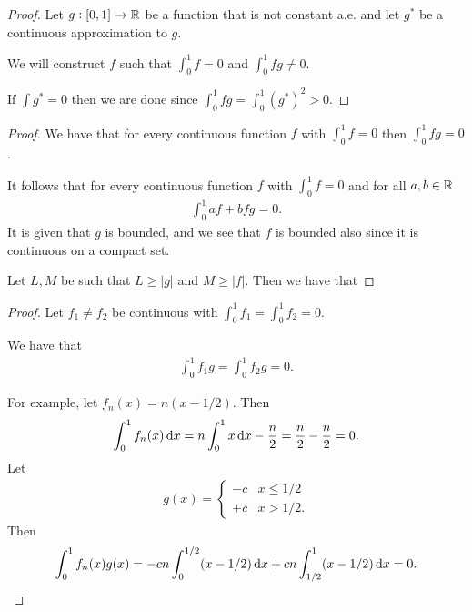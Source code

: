 \begin{proof}
  Let $g: [0, 1] \to \mathbb{R}$ be a function that is not constant a.e. and let $g^*$ be a continuous approximation
  to $g$.

  We will construct $f$ such that $\int_0^1 f = 0$ and $\int_0^1 fg \neq 0$.

  If $\int g^* = 0$ then we are done since $\int_0^1 fg = \int_0^1 (g^*)^2 > 0$.


\end{proof}




\begin{proof}
  We have that for every continuous function $f$ with $\int_0^1 f = 0$ then $\int_0^1 fg = 0$.

  It follows that for every continuous function $f$ with $\int_0^1 f = 0$ and for all $a, b \in \mathbb{R}$
  \begin{align*}
    \int_0^1 af + bfg = 0.
  \end{align*}
  It is given that $g$ is bounded, and we see that $f$ is bounded also since it is continuous on a compact set.

  Let $L, M$ be such that $L \geq |g|$ and $M \geq |f|$. Then we have that


\end{proof}


\begin{proof}
  Let $f_1 \neq f_2$ be continuous with $\int_0^1 f_1 = \int_0^1 f_2 = 0$.

  We have that
  \begin{align*}
    \int_0^1 f_1g = \int_0^1 f_2g = 0.
  \end{align*}

  For example, let $f_n(x) = n(x - 1/2)$. Then
  \begin{align*}
    \int_0^1 f_n(x) \dx = n\int_0^1 x \dx - \frac{n}{2} = \frac{n}{2} - \frac{n}{2} = 0.
  \end{align*}
  Let
  \begin{align*}
    g(x) =
    \begin{cases}
      -c & x \leq 1/2 \\
      +c  & x > 1/2.
  \end{cases}
  \end{align*}
  Then
  \begin{align*}
    \int_0^1 f_n(x) g(x)
    = -cn\int_0^{1/2}(x - 1/2) \dx + cn\int_{1/2}^1(x - 1/2) \dx
    = 0.
  \end{align*}
\end{proof}









